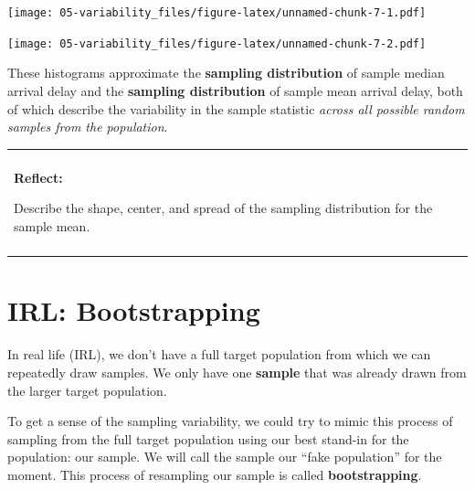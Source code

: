 \documentclass[
]{book}
\newenvironment{Shaded}{\begin{snugshade}}{\end{snugshade}}
\newcommand{\CharTok}[1]{\textcolor[rgb]{0.31,0.60,0.02}{#1}}
\newcommand{\CommentTok}[1]{\textcolor[rgb]{0.56,0.35,0.01}{\textit{#1}}}
\newcommand{\DataTypeTok}[1]{\textcolor[rgb]{0.13,0.29,0.53}{#1}}
\newcommand{\DecValTok}[1]{\textcolor[rgb]{0.00,0.00,0.81}{#1}}
\newcommand{\KeywordTok}[1]{\textcolor[rgb]{0.13,0.29,0.53}{\textbf{#1}}}
\newcommand{\NormalTok}[1]{#1}
\newcommand{\OperatorTok}[1]{\textcolor[rgb]{0.81,0.36,0.00}{\textbf{#1}}}
\newcommand{\StringTok}[1]{\textcolor[rgb]{0.31,0.60,0.02}{#1}}
\newenvironment{reflect}
{
    \begin{center}
    
    \begin{tabular}{|p{0.8\textwidth}|}
    \rowcolor{LightBlue}
    \hline\\
    \rowcolor{LightBlue}
    \textbf{Reflect:}
}
{
    \\\rowcolor{LightBlue}
    \\\hline
    \end{tabular} 
    \end{center}
}
\begin{document}
\texttt{[image: 05-variability\_files/figure-latex/unnamed-chunk-7-1.pdf]}

\begin{Shaded}
\end{Shaded}

\texttt{[image: 05-variability\_files/figure-latex/unnamed-chunk-7-2.pdf]}

These histograms approximate the \textbf{sampling distribution} of sample median arrival delay and the \textbf{sampling distribution} of sample mean arrival delay, both of which describe the variability in the sample statistic \emph{across all possible random samples from the population}.

\begin{reflect}
Describe the shape, center, and spread of the sampling distribution for
the sample mean.
\end{reflect}

\hypertarget{irl-bootstrapping}{%
\section{IRL: Bootstrapping}\label{irl-bootstrapping}}

In real life (IRL), we don't have a full target population from which we can repeatedly draw samples. We only have one \textbf{sample} that was already drawn from the larger target population.

To get a sense of the sampling variability, we could try to mimic this process of sampling from the full target population using our best stand-in for the population: our sample. We will call the sample our ``fake population'' for the moment. This process of resampling our sample is called \textbf{bootstrapping}.
\end{document}
